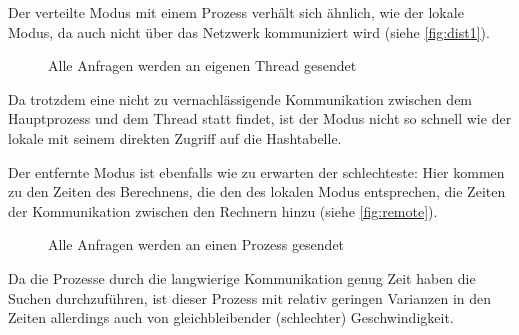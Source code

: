 \documentclass{scrreprt}
\begin{document}
Der verteilte Modus mit einem Prozess verhält sich ähnlich, wie der lokale Modus, da auch nicht über das Netzwerk kommuniziert wird (siehe \autoref{fig:dist1}). %
\begin{figure}[!ht]
\centering
{}
\caption{Alle Anfragen werden an eigenen Thread gesendet}
\label{fig:dist1}
\end{figure}%
Da trotzdem eine nicht zu vernachlässigende Kommunikation zwischen dem Hauptprozess und dem Thread statt findet, ist der Modus nicht so schnell wie der lokale mit seinem direkten Zugriff auf die Hashtabelle. \bigskip

Der entfernte Modus ist ebenfalls wie zu erwarten der schlechteste: Hier kommen zu den Zeiten des Berechnens, die den des lokalen Modus entsprechen, die Zeiten der Kommunikation zwischen den Rechnern hinzu (siehe \autoref{fig:remote}). %
\begin{figure}[!ht]
\centering
{}
\caption{Alle Anfragen werden an einen Prozess gesendet}
\label{fig:remote}
\end{figure}%
Da die Prozesse durch die langwierige Kommunikation genug Zeit haben die Suchen durchzuführen, ist dieser Prozess mit relativ geringen Varianzen in den Zeiten allerdings auch von gleichbleibender (schlechter) Geschwindigkeit. \bigskip
\end{document}
